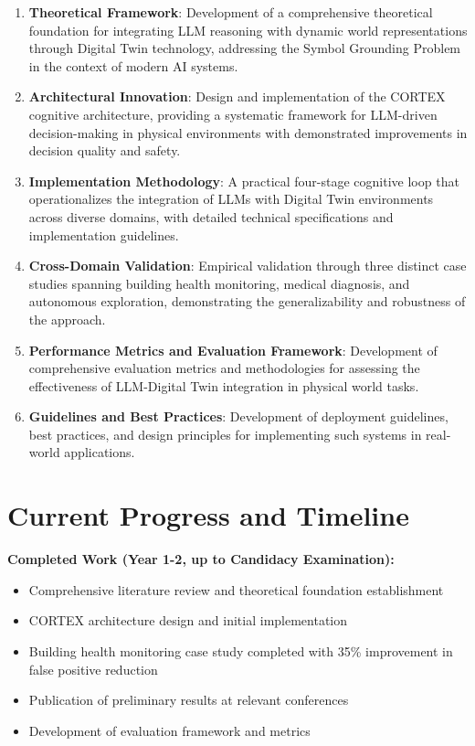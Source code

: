\begin{enumerate}
    \item \textbf{Theoretical Framework}: Development of a comprehensive theoretical foundation for integrating LLM reasoning with dynamic world representations through Digital Twin technology, addressing the Symbol Grounding Problem in the context of modern AI systems.
    
    \item \textbf{Architectural Innovation}: Design and implementation of the CORTEX cognitive architecture, providing a systematic framework for LLM-driven decision-making in physical environments with demonstrated improvements in decision quality and safety.
    
    \item \textbf{Implementation Methodology}: A practical four-stage cognitive loop that operationalizes the integration of LLMs with Digital Twin environments across diverse domains, with detailed technical specifications and implementation guidelines.
    
    \item \textbf{Cross-Domain Validation}: Empirical validation through three distinct case studies spanning building health monitoring, medical diagnosis, and autonomous exploration, demonstrating the generalizability and robustness of the approach.
    
    \item \textbf{Performance Metrics and Evaluation Framework}: Development of comprehensive evaluation metrics and methodologies for assessing the effectiveness of LLM-Digital Twin integration in physical world tasks.
    
    \item \textbf{Guidelines and Best Practices}: Development of deployment guidelines, best practices, and design principles for implementing such systems in real-world applications.
\end{enumerate}

\section{Current Progress and Timeline}

\textbf{Completed Work (Year 1-2, up to Candidacy Examination):}
\begin{itemize}
    \item Comprehensive literature review and theoretical foundation establishment
    \item CORTEX architecture design and initial implementation
    \item Building health monitoring case study completed with 35\% improvement in false positive reduction
    \item Publication of preliminary results at relevant conferences
    \item Development of evaluation framework and metrics
\end{itemize}

